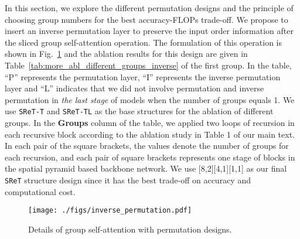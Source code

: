 \documentclass[runningheads]{llncs}
\begin{document}
	In this section, we explore the different permutation designs and the principle of choosing group numbers for the best accuracy-FLOPs trade-off. We propose to insert an inverse permutation layer to preserve the input order information after the sliced group self-attention operation. The formulation of this operation is shown in Fig.~\ref{fig:expr:inverse} and the ablation results for this design are given in Table~\ref{tab:more_abl_different_groups_inverse} of the first group. In the table, ``P'' represents the permutation layer, ``I'' represents the inverse permutation layer and ``L'' indicates that we did not involve permutation and inverse permutation in {\em the last stage} of models when the number of groups equals 1. We use {\texttt{SReT-T}} and {\texttt{SReT-TL}} as the base structures for the ablation of different groups. In the {\bf Groups} column of the table, we applied two loops of recursion in each recursive block according to the ablation study in Table 1 of our main text. In each pair of the square brackets, the values denote the number of groups for each recursion, and each pair of square brackets represents one stage of blocks in the spatial pyramid based backbone network. We use [8,2][4,1][1,1] as our final \texttt{SReT} structure design since it has the best trade-off on accuracy and computational cost.
	
	\begin{figure}[t]
		\centering\small
		\texttt{[image: ./figs/inverse\_permutation.pdf]} \vspace{-0.05in}
		\caption{Details of group self-attention with permutation designs.}
		\label{fig:expr:inverse} \vspace{-0.15in}
	\end{figure}
	
\end{document}
